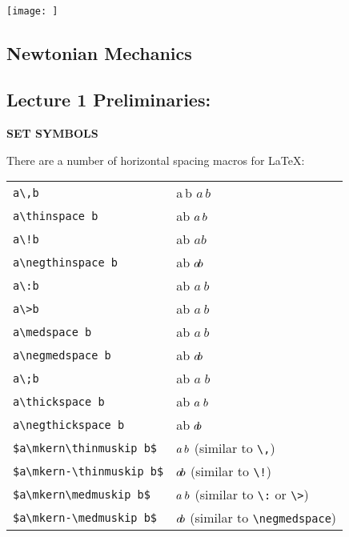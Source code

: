 \qquad
\underline{}
\\\texttt{[image: ]}\quad
\begin{center}
\section*{Newtonian Mechanics}
\subsection*{Lecture 1 Preliminaries:}
\end{center}
\begin{center}
    {\Large \textbf{SET SYMBOLS}}
\end{center}

There are a number of horizontal spacing macros for LaTeX:
\begin{tabular}{lp{5cm}}
  \verb|a\,b|                     & a\,b \quad $a\, b$ \\
  \verb|a\thinspace b|            & a\thinspace b \quad $a\thinspace b$ \\
  \verb|a\!b|                     & a\!b \quad $a\!b$ \\
  \verb|a\negthinspace b|         & a\negthinspace b \quad $a\negthinspace b$ \\
  \verb|a\:b|                     & a\:b \quad $a\:b$ \\
  \verb|a\>b|                     & a\>b \quad $a\>b$ \\
  \verb|a\medspace b|             & a\medspace b \quad $a\medspace b$ \\
  \verb|a\negmedspace b|          & a\negmedspace b \quad $a\negmedspace b$ \\
  \verb|a\;b|                     & a\;b \quad $a\;b$ \\
  \verb|a\thickspace b|           & a\thickspace b \quad $a\thickspace b$ \\
  \verb|a\negthickspace b|        & a\negthickspace b \quad $a\negthickspace b$ \\
  \verb|$a\mkern\thinmuskip b$|   & $a\mkern\thinmuskip b$ (similar to \verb|\,|) \\
  \verb|$a\mkern-\thinmuskip b$|  & $a\mkern-\thinmuskip b$ (similar to \verb|\!|) \\
  \verb|$a\mkern\medmuskip b$|    & $a\mkern\medmuskip b$ (similar to \verb|\:| or \verb|\>|) \\
  \verb|$a\mkern-\medmuskip b$|   & $a\mkern-\medmuskip b$ (similar to \verb|\negmedspace|) \\

\end{tabular}
